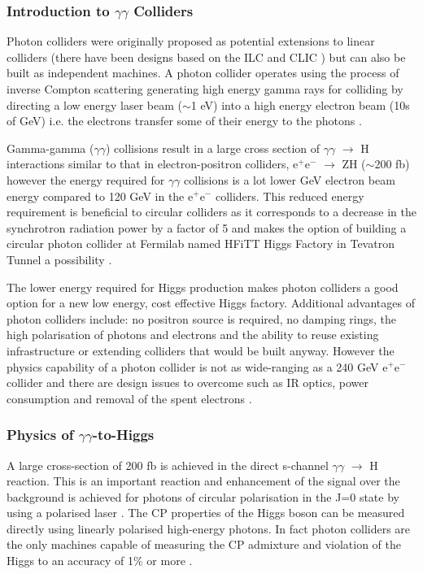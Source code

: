\subsubsection{Introduction to $\gamma\gamma$ Colliders}
Photon colliders were originally proposed as potential extensions to linear colliders (there have been designs based on the ILC and CLIC \cite{CLIC:Multilinear}) but can also be built as independent machines. A photon collider operates using the process of inverse Compton scattering \textendash generating  high energy gamma rays for colliding by directing a low energy laser beam ($\sim$1 eV) into a high energy electron beam (10s of GeV) i.e. the electrons transfer some of their energy to the photons \cite{Chou:Higgs}.

Gamma-gamma ($\gamma\gamma$) collisions result in a large cross section of $\gamma\gamma$ $\rightarrow$ H interactions similar to that in electron-positron colliders, e$^{+}$e$^{-}$ $\rightarrow$ ZH ($\sim$200 fb) \cite{Chou:Higgs} however the energy required for $\gamma\gamma$ collisions is a lot lower  GeV electron beam energy compared to 120 GeV in the e$^{+}$e$^{-}$ colliders. This reduced energy requirement is beneficial to circular colliders as it corresponds to a decrease in the synchrotron radiation power by a factor of 5 and makes the option of building a circular photon collider at Fermilab named HFiTT \textendash Higgs Factory in Tevatron Tunnel \textendash a possibility \cite{Chou:Higgs}. 

The lower energy required for Higgs production makes photon colliders a good option for a new low energy, cost effective Higgs factory. Additional advantages of photon colliders include: no positron source is required, no damping rings, the high polarisation of photons and electrons and the ability to reuse existing infrastructure or extending colliders that would be built anyway. However the physics capability of a photon collider is not as wide-ranging as a 240 GeV e$^{+}$e$^{-}$ collider and there are design issues to overcome such as IR optics, power consumption and removal of the spent electrons \cite{Blondel:HiggsF}.
 
\subsubsection{Physics of $\gamma\gamma$-to-Higgs}
A large cross-section of 200 fb is achieved in the direct s-channel $\gamma\gamma$ $\rightarrow$ H reaction. This is an important reaction and enhancement of the signal over the background is achieved for photons of circular polarisation in the J=0 state by using a polarised laser \cite{Blondel:HiggsF}.  The CP properties of the Higgs boson can be measured directly using linearly polarised high-energy photons. In fact photon colliders are the only machines capable of measuring the CP admixture and violation of the Higgs to an accuracy of 1\% or more \cite{Chou:Higgs}.

